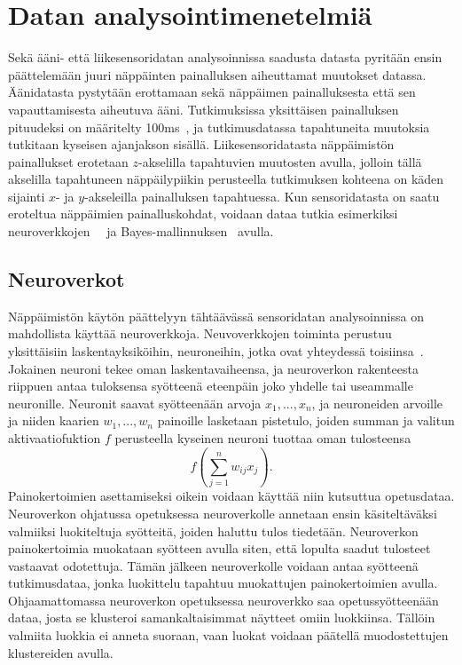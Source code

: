 \documentclass[finnish]{tktltiki2}
\theoremstyle{definition}
\theoremstyle{remark}
\begin{document}
\section{Datan analysointimenetelmiä}
Sekä ääni- että liikesensoridatan analysoinnissa saadusta datasta pyritään ensin päättelemään juuri näppäinten painalluksen aiheuttamat muutokset datassa. Äänidatasta pystytään erottamaan sekä näppäimen painalluksesta että sen vapauttamisesta aiheutuva ääni. Tutkimuksissa yksittäisen painalluksen pituudeksi on määritelty 100ms~\cite{berger}, ja tutkimusdatassa tapahtuneita muutoksia tutkitaan kyseisen ajanjakson sisällä. Liikesensoridatasta näppäimistön painallukset erotetaan $z$-akselilla tapahtuvien muutosten avulla, jolloin tällä akselilla tapahtuneen näppäilypiikin perusteella tutkimuksen kohteena on käden sijainti $x$- ja $y$-akseleilla painalluksen tapahtuessa. Kun sensoridatasta on saatu eroteltua näppäimien painalluskohdat, voidaan dataa tutkia esimerkiksi neuroverkkojen~\cite{maiti}~\cite{liu} ja Bayes-mallinnuksen~\cite{mole} avulla.

\subsection{Neuroverkot}
Näppäimistön käytön päättelyyn tähtäävässä sensoridatan analysoinnissa on mahdollista käyttää neuroverkkoja. Neuvoverkkojen toiminta perustuu yksittäisiin laskentayksiköihin, neuroneihin, jotka ovat yhteydessä toisiinsa~\cite{ert}. Jokainen neuroni tekee oman laskentavaiheensa, ja neuroverkon rakenteesta riippuen antaa tuloksensa syötteenä eteenpäin joko yhdelle tai useammalle neuronille. Neuronit saavat syötteenään arvoja $x_1,..., x_n$, ja neuroneiden arvoille ja niiden kaarien $w_1,...,w_n$ painoille lasketaan pistetulo, joiden summan ja valitun aktivaatiofuktion $f$ perusteella kyseinen neuroni tuottaa oman tulosteensa $$f(\sum_{j=1}^{n} w_{ij}x_j).$$
Painokertoimien asettamiseksi oikein voidaan käyttää niin kutsuttua opetusdataa. Neuroverkon ohjatussa opetuksessa neuroverkolle annetaan ensin käsiteltäväksi valmiiksi luokiteltuja syötteitä, joiden haluttu tulos tiedetään. Neuroverkon painokertoimia muokataan syötteen avulla siten, että lopulta saadut tulosteet vastaavat odotettuja. Tämän jälkeen neuroverkolle voidaan antaa syötteenä tutkimusdataa, jonka luokittelu tapahtuu muokattujen painokertoimien avulla. Ohjaamattomassa neuroverkon opetuksessa neuroverkko saa opetussyötteenään dataa, josta se klusteroi samankaltaisimmat näytteet omiin luokkiinsa. Tällöin valmiita luokkia ei anneta suoraan, vaan luokat voidaan päätellä muodostettujen klustereiden avulla.
\end{document}
